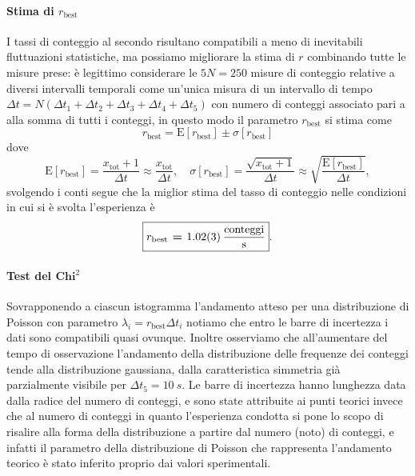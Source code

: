 \documentclass[10pt,oneside,a4paper]{article}
\begin{document}
\paragraph{Stima di $r_\mathrm{best}$}
I tassi di conteggio al secondo risultano compatibili a meno di inevitabili fluttuazioni statistiche, ma possiamo migliorare la stima di $r$ combinando tutte le misure prese: è legittimo considerare le $5 N = 250$ misure di conteggio relative a diversi intervalli temporali come un'unica misura di un intervallo di tempo $\Delta t = N ( \Delta t_1 + \Delta t_2 + \Delta t_3 + \Delta t_4 + \Delta t_5)$ con numero di conteggi associato pari a alla somma di tutti i conteggi, in questo modo il parametro $r_\mathrm{best}$ si stima come
\begin{equation}\label{eq:stima_r_tot}
	r_\mathrm{best} = \mathrm{E}[r_\mathrm{best}] \pm \sigma [r_\mathrm{best}]
\end{equation} dove
\[
	\mathrm{E}[r_\mathrm{best}] = \frac{x_{\mathrm{tot}} +1}{\Delta t} \approx \frac{x_{\mathrm{tot}}}{\Delta t}, \quad \sigma[r_\mathrm{best}] = \frac{\sqrt{x_{\mathrm{tot}} +1}}{\Delta t} \approx  \sqrt{\frac{\mathrm{E}[r_\mathrm{best}]}{\Delta t}},
\] svolgendo i conti segue che la miglior stima del tasso di conteggio nelle condizioni in cui si è svolta l'esperienza è 
\[
	\boxed{\textbf{$r_\mathrm{best}$ = {\SI{1.02 \pm 0.03}{\frac{conteggi}{s}}}}}.
\]

\paragraph{Test del $\mathbf{Chi}^2$}Sovrapponendo a ciascun istogramma l'andamento atteso per una distribuzione di Poisson con parametro $\lambda_i = r_{\mathrm{best}} \Delta t_i$ notiamo che entro le barre di incertezza i dati sono compatibili quasi ovunque. Inoltre osserviamo che all'aumentare del tempo di osservazione l'andamento della distribuzione delle frequenze dei conteggi tende alla distribuzione gaussiana, dalla caratteristica simmetria già  parzialmente visibile per $\Delta t_5 = \SI{10}{s}$. Le barre di incertezza hanno lunghezza data dalla radice del numero di conteggi, e sono state attribuite ai punti teorici invece che al numero di conteggi in quanto l'esperienza condotta si pone lo scopo di risalire alla forma della distribuzione a partire dal numero (noto) di conteggi, e infatti il parametro della distribuzione di Poisson che rappresenta l'andamento teorico è stato inferito proprio dai valori sperimentali.
\end{document}
